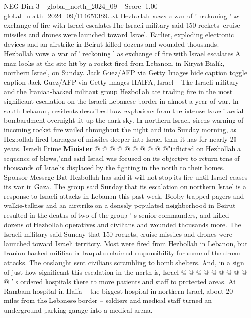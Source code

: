 \begin{textsample}{NEG Dim 3 – global\_north\_2024\_09 – Score -1.00 – global\_north\_2024\_09/114651389.txt}  \label{ex:f3_neg_300}
Hezbollah vows a war of ' reckoning ' as exchange of fire with Israel escalatesThe Israeli military said 150 rockets, cruise missiles and drones were launched toward Israel.
Earlier, exploding electronic devices and an airstrike in Beirut killed dozens and wounded thousands.
Hezbollah vows a war of ' reckoning ' as exchange of fire with Israel escalates A man looks at the site hit by a rocket fired from Lebanon, in Kiryat Bialik, northern Israel, on Sunday.
Jack Guez/AFP via Getty Images hide caption toggle caption Jack Guez/AFP via Getty Images HAIFA, Israel -- The Israeli military and the Iranian-backed militant group Hezbollah are trading fire in the most significant escalation on the Israeli-Lebanese border in almost a year of war.
In south Lebanon, residents described how explosions from the intense Israeli aerial bombardment overnight lit up the dark sky.
In northern Israel, sirens warning of incoming rocket fire wailed throughout the night and into Sunday morning, as Hezbollah fired barrages of missiles deeper into Israel than it has for nearly 20 years.
Israeli Prime \textbf{Minister} @ @ @ @ @ @ @ @ @ @"inflicted on Hezbollah a sequence of blows,"and said Israel was focused on its objective to return tens of thousands of Israelis displaced by the fighting in the north to their homes.
Sponsor Message But Hezbollah has said it will not stop its fire until Israel ceases its war in Gaza.
The group said Sunday that its escalation on northern Israel is a response to Israeli attacks in Lebanon this past week.
Booby-trapped pagers and walkie-talkies and an airstrike on a densely populated neighborhood in Beirut resulted in the deaths of two of the group ' s senior commanders, and killed dozens of Hezbollah operatives and civilians and wounded thousands more.
The Israeli military said Sunday that 150 rockets, cruise missiles and drones were launched toward Israeli territory.
Most were fired from Hezbollah in Lebanon, but Iranian-backed militias in Iraq also claimed responsibility for some of the drone attacks.
The onslaught sent civilians scrambling to bomb shelters.
And, in a sign of just how significant this escalation in the north is, Israel @ @ @ @ @ @ @ @ @ @ ' s ordered hospitals there to move patients and staff to protected areas.
At Rambam hospital in Haifa -- the biggest hospital in northern Israel, about 20 miles from the Lebanese border -- soldiers and medical staff turned an underground parking garage into a medical arena.

\end{textsample}
